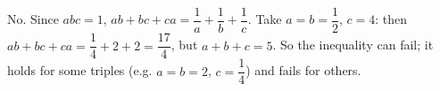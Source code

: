No. Since $abc=1$, $ab+bc+ca=\dfrac1a+\dfrac1b+\dfrac1c$. Take $a=b=\dfrac12$, $c=4$: then $ab+bc+ca=\dfrac14+2+2=\dfrac{17}4$, but $a+b+c=5$. So the inequality can fail; it holds for some triples (e.g. $a=b=2$, $c=\dfrac14$) and fails for others.
